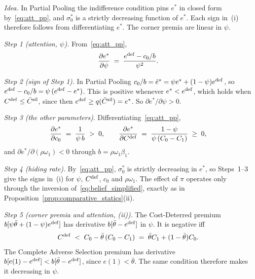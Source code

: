\upshape
\emph{Idea.} In Partial Pooling the indifference condition pins $e^*$ in closed form by~\eqref{eq:att_pp}, and $\sigma_0^*$ is a strictly decreasing function of $e^*$. Each sign in~(i) therefore follows from differentiating $e^*$. The corner premia are linear in $\psi$.

\emph{Step 1 (attention, $\psi$).} From~\eqref{eq:att_pp},
\begin{equation*}
    \frac{\partial e^*}{\partial\psi}\;=\;\frac{e^{\rm def}-c_0/b}{\psi^2}.
\end{equation*}

\emph{Step 2 (sign of Step 1).} In Partial Pooling $c_0/b=\tilde e^*=\psi e^*+(1-\psi)e^{\rm def}$, so $e^{\rm def}-c_0/b=\psi\,(e^{\rm def}-e^*)$. This is positive whenever $e^*<e^{\rm def}$, which holds when $C^{\rm def}\le\bar C^{\rm sil}$, since then $e^{\rm def}\ge q(\bar C^{\rm sil})=e^*$. So $\partial e^*/\partial\psi>0$.

\emph{Step 3 (the other parameters).} Differentiating~\eqref{eq:att_pp},
\begin{equation*}
    \frac{\partial e^*}{\partial c_0}\;=\;\frac{1}{\psi\,b}\;>\;0,\qquad
    \frac{\partial e^*}{\partial C^{\rm def}}\;=\;\frac{1-\psi}{\psi\,(C_0-C_1)}\;\ge\;0,
\end{equation*}
and $\partial e^*/\partial(\rho\omega_1)<0$ through $b=\rho\omega_1\beta_1$.

\emph{Step 4 (hiding rate).} By~\eqref{eq:att_pp}, $\sigma_0^*$ is strictly decreasing in $e^*$, so Steps~1--3 give the signs in~(i) for $\psi$, $C^{\rm def}$, $c_0$ and $\rho\omega_1$. The effect of $\pi$ operates only through the inversion of~\eqref{eq:belief_simplified}, exactly as in Proposition~\ref{prop:comparative_statics}(ii).

\emph{Step 5 (corner premia and attention, (ii)).} The Cost-Deterred premium $b[\psi\bar\theta+(1-\psi)e^{\rm def}]$ has derivative $b[\bar\theta-e^{\rm def}]$ in $\psi$. It is negative iff
\begin{equation*}
    C^{\rm def}\;<\;C_0-\bar\theta\,(C_0-C_1)\;=\;\bar\theta C_1+(1-\bar\theta)C_0 .
\end{equation*}
The Complete Adverse Selection premium has derivative $b[e(1)-e^{\rm def}]<b[\bar\theta-e^{\rm def}]$, since $e(1)<\bar\theta$. The same condition therefore makes it decreasing in $\psi$.

